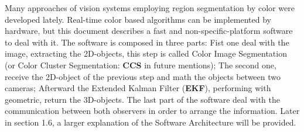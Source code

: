 Many approaches of vision systems employing region segmentation \cite{fast_segmentation_Mitra} \cite{fuzzy_segmentation} by color were developed lately. Real-time color based algorithms can be implemented by hardware, but this document describes a fast and non-specific-platform software to deal with it. The software is composed in three parts: Fist one deal with the image, extracting the 2D-objects, this step is called Color Image Segmentation \cite{JamesBruce_CMU_SEG} (or Color Cluster Segmentation: \textbf{CCS} in future mentions); The second one, receive the 2D-object of the previous step and math the objects between two cameras; Afterward the Extended Kalman Filter \cite{GabrielTerejanu_EKF} (\textbf{EKF}), performing with geometric, return the 3D-objects. The last part of the software deal with the communication between both observers in order to arrange the information. Later in section 1.6, a larger explanation of the Software Architecture will be provided.